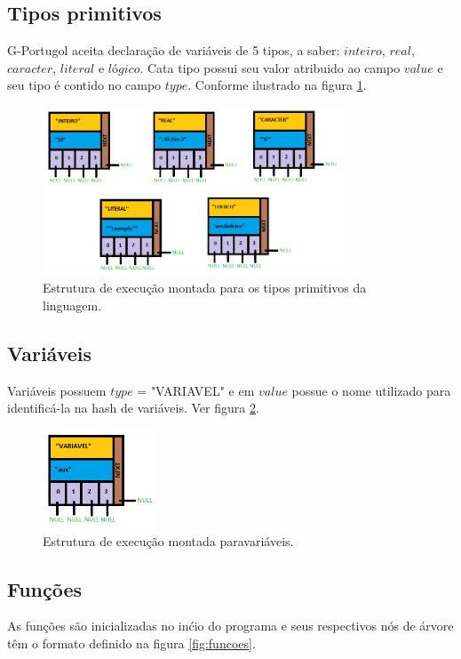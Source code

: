 \documentclass[a4paper,12pt]{report}
\begin{document}
\subsection{Tipos primitivos}

G-Portugol aceita declara\c{c}\~ao de vari\'aveis de 5 tipos, a saber: $inteiro$, $real$, $caracter$, $literal$ e $l$\'o$gico$. Cata tipo possui seu valor atribuido ao campo $value$ e seu tipo \'e contido no campo $type$. Conforme ilustrado na figura \ref{fig:fatores}.

\begin{figure}
\centering
\includegraphics[width=0.8\textwidth]{imgs/Tipos_primitivos.png}
\caption{\label{fig:fatores}Estrutura de execu\c{c}\~ao montada para os tipos primitivos da linguagem.}
\end{figure}

\subsection{Vari\'aveis}

Vari\'aveis possuem $type$ = "VARIAVEL" e em $value$ possue o nome utilizado para identific\'a-la na hash de vari\'aveis. Ver figura \ref{fig:variaveis}.

\begin{figure}
\centering
\includegraphics[width=0.3\textwidth]{imgs/Variavel.png}
\caption{\label{fig:variaveis}Estrutura de execu\c{c}\~ao montada paravari\'aveis.}
\end{figure}

\subsection{Fun\c{c}\~oes}
As fun\c{c}\~oes s\~ao inicializadas no in\'cio do programa e seus respectivos n\'os de \'arvore t\^em o formato definido na figura \ref{fig:funcoes}.
\end{document}
